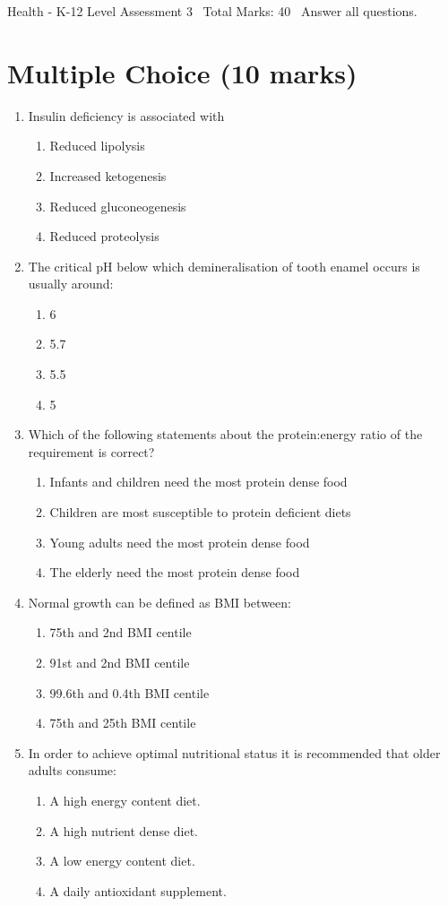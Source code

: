 \documentclass[12pt]{article}
\begin{document}
\begin{center}
Health - K-12 Level Assessment 3 \
Total Marks: 40 \
Answer all questions.
\end{center}

\section*{Multiple Choice (10 marks)}
\begin{enumerate}[label=\arabic*.]
\item Insulin deficiency is associated with
\begin{enumerate}[label=(\alph*)]
    \item Reduced lipolysis
    \item Increased ketogenesis
    \item Reduced gluconeogenesis
    \item Reduced proteolysis
\end{enumerate}
\item The critical pH below which demineralisation of tooth enamel occurs is usually around:
\begin{enumerate}[label=(\alph*)]
    \item 6
    \item 5.7
    \item 5.5
    \item 5
\end{enumerate}
\item Which of the following statements about the protein:energy ratio of the requirement is
correct?
\begin{enumerate}[label=(\alph*)]
    \item Infants and children need the most protein dense food
    \item Children are most susceptible to protein deficient diets
    \item Young adults need the most protein dense food
    \item The elderly need the most protein dense food
\end{enumerate}
\item Normal growth can be defined as BMI between:
\begin{enumerate}[label=(\alph*)]
    \item 75th and 2nd BMI centile
    \item 91st and 2nd BMI centile
    \item 99.6th and 0.4th BMI centile
    \item 75th and 25th BMI centile
\end{enumerate}
\item In order to achieve optimal nutritional status it is recommended that older adults
consume:
\begin{enumerate}[label=(\alph*)]
    \item A high energy content diet.
    \item A high nutrient dense diet.
    \item A low energy content diet.
    \item A daily antioxidant supplement.
\end{enumerate}
\end{enumerate}
\end{document}
